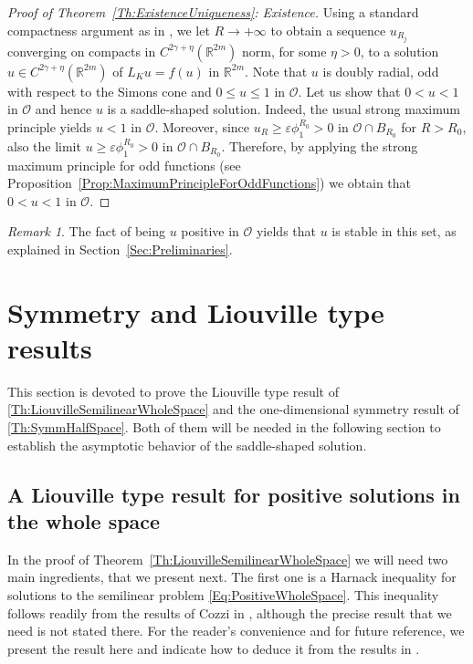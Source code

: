 \documentclass[12pt,reqno]{amsart}
\theoremstyle{definition}
\theoremstyle{remark}
\newtheorem{remark}[theorem]{Remark}
\newcommand{\con}[1]{\mathbb{#1}}
\newcommand{\R}{\con{R}} %
\newcommand{\ocal}{\mathcal{O}}
\newcommand{\s}{\gamma}
\numberwithin{equation}{section}
\begin{document}
\begin{proof}[Proof of Theorem~\ref{Th:ExistenceUniqueness}: Existence]
	Using a standard compactness argument as in \cite{FelipeSanz-Perela:IntegroDifferentialI}, we let $R\to +\infty$ to obtain a sequence $u_{R_j}$ converging on compacts in  $C^{2\s + \eta}(\R^{2m})$ norm, for some $\eta > 0$, to a solution $u \in C^{2\s + \eta}(\R^{2m})$ of $L_K u = f(u)$ in $\R^{2m}$. Note that $u$ is doubly radial, odd with respect to the Simons cone and $0\leq u \leq 1$ in $\ocal$. Let us show that $0 < u < 1$ in $\ocal$ and hence $u$ is a saddle-shaped solution. Indeed, the usual strong maximum principle yields $u<1$ in $\ocal$. Moreover, since $u_R\geq\varepsilon \phi_1^{R_0}>0$ in  $\ocal \cap B_{R_0}$ for $R>R_0$, also the limit $u\geq\varepsilon \phi_1^{R_0}>0$ in  $\ocal \cap B_{R_0}$. Therefore, by applying the strong maximum principle for odd functions (see Proposition~\ref{Prop:MaximumPrincipleForOddFunctions}) we obtain that $0 < u < 1$ in $\ocal$.
\end{proof}


\begin{remark}
	The fact of being $u$ positive in $\ocal$ yields that $u$ is stable in this set, as explained in Section~\ref{Sec:Preliminaries}. 
\end{remark}

\section{Symmetry and Liouville type results}
\label{Sec:SymmetryResults}




This section is devoted to prove the Liouville type result of \ref{Th:LiouvilleSemilinearWholeSpace} and the one-dimensional symmetry result of \ref{Th:SymmHalfSpace}. Both of them will be needed in the following section to establish the asymptotic behavior of the saddle-shaped solution. 

\subsection{A Liouville type result for positive solutions in the whole space}

In the proof of Theorem~\ref{Th:LiouvilleSemilinearWholeSpace} we will need two main ingredients, that we present next. The first one is a Harnack inequality for solutions to the semilinear problem \eqref{Eq:PositiveWholeSpace}. This inequality follows readily from the results of Cozzi in \cite{Cozzi-DeGiorgiClassesLong}, although the precise result that we need is not stated there. For the reader's convenience and for future reference, we present the result here and indicate how to deduce it from the results in \cite{Cozzi-DeGiorgiClassesLong}.
\end{document}
